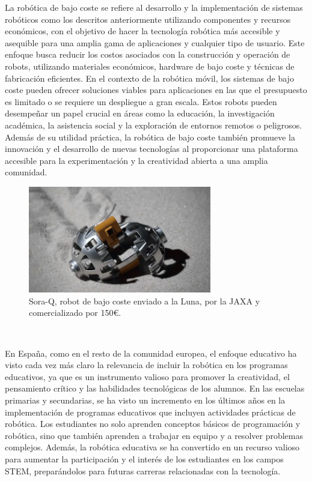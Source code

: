 La robótica de bajo coste se refiere al desarrollo y la implementación de
sistemas robóticos como los descritos anteriormente utilizando componentes y
recursos económicos, con el objetivo de hacer la tecnología robótica más
accesible y asequible para una amplia gama de aplicaciones y cualquier tipo de
usuario.
Este enfoque busca reducir los costos asociados con la construcción y operación
de robots, utilizando materiales económicos, hardware de bajo coste y técnicas
de fabricación eficientes. En el contexto de la robótica móvil, los sistemas de
bajo coste pueden ofrecer soluciones viables para aplicaciones en las que el
presupuesto es limitado o se requiere un despliegue a gran escala.
Estos robots pueden desempeñar un papel crucial en áreas como la educación, la
investigación académica, la asistencia social y la exploración de entornos
remotos o peligrosos.
Además de su utilidad práctica, la robótica de bajo coste también promueve la
innovación y el desarrollo de nuevas tecnologías al proporcionar una plataforma
accesible para la experimentación y la creatividad abierta a una amplia
comunidad.


\begin{figure} [h!]
  \begin{center}
    \includegraphics[width=8cm]{figs/SoraQ_lunar_robot_JAXA}
  \end{center}
  \caption{Sora-Q, robot de bajo coste enviado a la Luna, por la JAXA y comercializado por 150€.}
  \label{fig:sora_q}
\end{figure}\

En España, como en el resto de la comunidad europea, el enfoque educativo ha
visto cada vez más claro la relevancia de incluir la robótica en los programas
educativos, ya que es un instrumento valioso para promover la creatividad, el
pensamiento crítico y las habilidades tecnológicas de los alumnos.
En las escuelas primarias y secundarias, se ha visto un incremento en los
últimos años en la implementación de programas educativos que incluyen
actividades prácticas de robótica. Los estudiantes no solo aprenden conceptos
básicos de programación y robótica, sino que también aprenden a trabajar en
equipo y a resolver problemas complejos.
Además, la robótica educativa se ha convertido en un recurso valioso para
aumentar la participación y el interés de los estudiantes en los campos STEM,
preparándolos para futuras carreras relacionadas con la tecnología.

